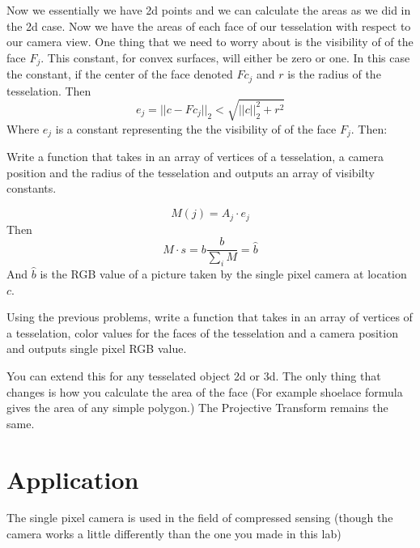 Now we essentially we have 2d points and we can calculate the areas as we did in the 2d case. Now we have the areas of each face of our tesselation with respect to our camera view. One thing that we need to worry about is the visibility of of the face $F_j$. This constant, for convex surfaces, will either be zero or one. In this case the constant, if the center of the face denoted $Fc_j$ and $r$ is the radius of the tesselation. Then
\[
e_j=||c-Fc_j||_2<\sqrt{||c||_2^2+r^2}
\] 
Where $e_j$ is a constant representing the  the visibility of of the face $F_j$. Then:

\begin{problem}
Write a function that takes in an array of vertices of a tesselation, a camera position and the radius of the tesselation and outputs an array of visibilty constants.
\end{problem}
\begin{equation}
M(j) = A_j \cdot e_j
\end{equation}
Then
\begin{equation}
M \cdot s = b
\frac{b}{\sum_i M} = \hat{b}
\end{equation}
And $\hat{b}$ is the RGB value of a picture taken by the single pixel camera at location $c$.

\begin{problem}
Using the previous problems, write a function that takes in an array of vertices of a tesselation, color values for the faces of the tesselation and a camera position and outputs single pixel RGB value.
\end{problem}

You can extend this for any tesselated object 2d or 3d. The only thing that changes is how you calculate the area of the face (For example shoelace formula gives the area of any simple polygon.) The Projective Transform remains the same. 

\section{Application}
The single pixel camera is used in the field of compressed sensing (though the camera works a little differently than the one you made in this lab)


